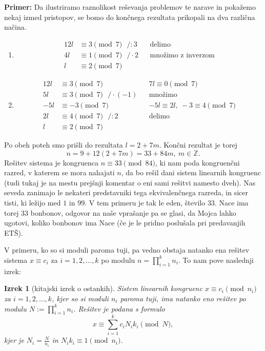 \documentclass[12pt, a4paper]{article}
\newtheorem{izr}{Izrek}
\newenvironment{prim}[1][]{\par\medskip\noindent \textbf{Primer: }}{\medskip}
\begin{document}
\begin{prim}
Da ilustriramo raznolikost reševanja problemov te narave in pokažemo nekaj izmed pristopov, se bomo do končnega rezultata prikopali na dva različna načina.
\begin{enumerate}
\item
\begin{align*}
12l&\equiv 3 \pmod 7 \ \ \ /:3 &&\text{delimo}\\
4l&\equiv 1 \pmod 7 \ \ \ /\cdot 2 &&\text{množimo z inverzom} \\
l&\equiv 2 \pmod 7 
\end{align*}
\item
\begin{align*}
12l&\equiv 3 \pmod 7 &&7l\equiv 0 \pmod 7 \\
5l&\equiv 3 \pmod 7 \ \ \ /\cdot (-1) &&\text{množimo}\\
-5l&\equiv -3 \pmod 7 &&-5l\equiv 2l,\  -3\equiv 4 \pmod 7\\
2l&\equiv 4 \pmod 7 \ \ \ /:2 &&\text{delimo}\\
l&\equiv 2 \pmod 7
\end{align*}
\end{enumerate}
 
Po obeh poteh smo prišli do rezultata $l=2+7m$. Končni rezultat je torej
$$ n=9+12(2+7m)=33+84m,\ m\in \mathbb{Z}.$$
Rešitev sistema je kongruenca $n\equiv 33 \pmod{84}$, ki nam poda kongruenčni razred, v katerem se mora nahajati $n$, da bo rešil dani sistem linearnih kongruenc (tudi tukaj je na mestu prejšnji komentar o eni sami rešitvi namesto dveh). Nas seveda zanimajo le nekateri predstavniki tega ekvivalenčnega razreda, in sicer tisti, ki ležijo med $1$ in $99$. V tem primeru je tak le eden, število $33$. Nace ima torej 33 bonbonov, odgovor na naše vprašanje pa se glasi, da Mojca lahko ugotovi, koliko bonbonov ima Nace (če je le pridno poslušala pri predavanjih ETŠ).
\end{prim}

V primeru, ko so si moduli paroma tuji, pa vedno obstaja natanko ena rešitev sistema $x\equiv c_{i}$ za $i=1,2,\dots,k$ po modulu $n=\prod_{i=1}^{k}n_{i}$. To nam pove naslednji izrek:

\begin{izr}[kitajski izrek o ostankih]
Sistem linearnih kongruenc $x\equiv c_{i} \pmod{n_{i}}$ za $i=1,2,\dots,k$, kjer so si moduli $n_{i}$ paroma tuji, ima natanko eno rešitev po modulu $N:=\prod_{i=1}^{k}n_{i}$. Rešitev je podana s formulo
$$ x\equiv \sum_{i=1}^{k}c_{i}N_{i}k_{i} \pmod N,$$
kjer je $N_{i}=\frac{N}{n_{i}}$ in $N_{i}k_{i}\equiv 1 \pmod{n_{i}}$.
\end{izr}
\end{document}
